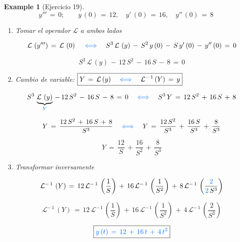 \documentclass[a4paper,11pt,openany]{book}
\newtheorem{exmp}{Example}[section]
\newcommand*{\itembolasazules}[1]{%
\footnotesize\protect\tikz[baseline=-3pt]%
\protect\node[scale=.7, circle, shade, ball
color=green]{\color{white}\Large\bf#1};}
\begin{document}
\newpage
 
\begin{exmp}[Ejercicio 19]

$$y'''\,=\,0; \qquad y\,(0)\,=\,12, \quad y'\,(0)\,=\,16, \quad y''\,(0)\,=\,8$$
 
\begin{enumerate}[label=\itembolasazules{\arabic*}]
 
\item Tomar el operador $\mathcal{L}$ a ambos lados
 
 
$$\mathcal{L}\,\left(y''' \right)\,=\,\mathcal{L}\,\left(0 \right) \quad \textcolor{brandeisblue}{\iff} \quad S^{3}\,\mathcal{L}\,\left(y \right)\,-\,S^{2}\,y\,(0)\,-\,S\,y'\,(0)\,-\,y''\,(0)\,=\,0$$
 
$$S^{3}\,\mathcal{L}\,\left(y \right)\,-\,12\,S^{2}\,-\,16\,S\,-\,8\,=\,0$$
 
\item Cambio de variable: $\boxed{Y\,=\,\mathcal{L}\,(y) \quad \textcolor{brandeisblue}{\iff} \quad \mathcal{L}^{-\,1}\,(Y)\,=\,y  }$
 
$$S^{3}\,\underbrace{\mathcal{L}\,\left(y \right)}_{\textcolor{brandeisblue}{Y} }\,-\,12\,S^{2}\,-\,16\,S\,-\,8\,=\,0 \quad \textcolor{brandeisblue}{\iff} \quad S^{3}\,Y\,=\,12\,S^{2}\,+\,16\,S\,+\,8$$
 
$$Y\,=\,\dfrac{12\,S^{2}\,+\,16\,S\,+\,8}{S^{3}} \quad \textcolor{brandeisblue}{\iff} \quad Y\,=\,\dfrac{12\,S^{2}}{S^{3}}\,+\,\dfrac{16\,S}{S^{3}}\,+\,\dfrac{8}{S^{3}} $$
 
$$Y\,=\,\dfrac{12 }{S }\,+\,\dfrac{16}{S^{2}}\,+\,\dfrac{8}{S^{3}} $$
 
\item Transformar inversamente 
 
$$\mathcal{L}^{-\,1}\,\left(Y \right)\,=\,12\,\mathcal{L}^{-\,1}\,\left(\dfrac{1}{S} \right)\,+\,16\,\mathcal{L}^{-\,1}\,\left(\dfrac{1}{S^{2}} \right)\,+\,8\,\mathcal{L}^{-\,1}\,\left(\dfrac{\textcolor{brandeisblue}{2} }{\textcolor{brandeisblue}{2}\,S^{3}} \right)  $$
 
$$\mathcal{L}^{-\,1}\,\left(Y \right)\,=\,12\,\mathcal{L}^{-\,1}\,\left(\dfrac{1}{S} \right)\,+\,16\,\mathcal{L}^{-\,1}\,\left(\dfrac{1}{S^{2}} \right)\,+\,4\,\mathcal{L}^{-\,1}\,\left(\dfrac{2}{S^{3}} \right)  $$
 
$$\boxed{\textcolor{brandeisblue}{y\,(t)\,=\,12\,+\,16\,t\,+\,4\,t^{2} } } $$
 
\end{enumerate}

\end{exmp}
 
\end{document}
